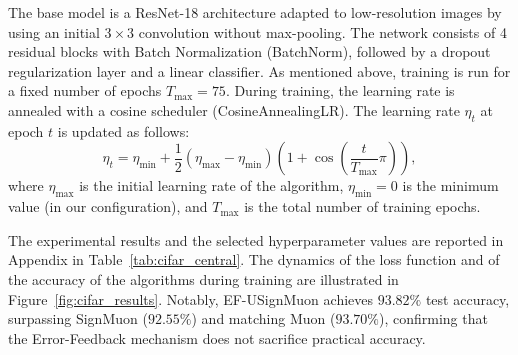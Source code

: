\documentclass{article}
\begin{document}
The base model is a ResNet-18 architecture adapted to low-resolution images by using an initial $3\times3$ convolution without max-pooling. The network consists of 4 residual blocks with Batch Normalization (BatchNorm), followed by a dropout regularization layer and a linear classifier. As mentioned above, training is run for a fixed number of epochs $T_{\max}=75$. During training, the learning rate is annealed with a cosine scheduler (CosineAnnealingLR). The learning rate $\eta_t$ at epoch $t$ is updated as follows:
\begin{equation}
\eta_t = \eta_{\text{min}} + \frac{1}{2}(\eta_{\text{max}} - \eta_{\text{min}})\left(1 + \cos\left(\frac{t}{T_{\text{max}}}\pi\right)\right),
\end{equation}
where $\eta_{\text{max}}$ is the initial learning rate of the algorithm, $\eta_{\text{min}} = 0$ is the minimum value (in our configuration), and $T_{\text{max}}$ is the total number of training epochs.

The experimental results and the selected hyperparameter values are reported in Appendix in Table~\ref{tab:cifar_central}. The dynamics of the loss function and of the accuracy of the algorithms during training are illustrated in Figure~\ref{fig:cifar_results}. Notably, EF-USignMuon achieves $93.82\%$ test accuracy, surpassing SignMuon ($92.55\%$) and matching Muon ($93.70\%$), confirming that the Error-Feedback mechanism does not sacrifice practical accuracy.
\end{document}
